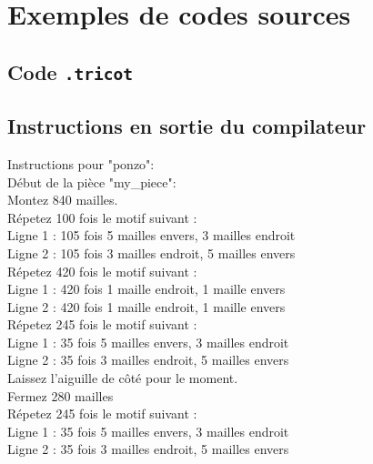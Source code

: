 \documentclass{article}
\begin{document}
\appendix

\section{Exemples de codes sources}

\subsection{Code \texttt{.tricot}}




\subsection{Instructions en sortie du compilateur}

\setlength{\parindent}{0cm}

Instructions pour "ponzo":\\

Début de la pièce "my\_piece":\\
Montez 840 mailles.\\

Répetez 100 fois le motif suivant :\\
Ligne 1 : 105 fois 5 mailles envers, 3 mailles endroit\\
Ligne 2 : 105 fois 3 mailles endroit, 5 mailles envers\\


Répetez 420 fois le motif suivant :\\
Ligne 1 : 420 fois 1 maille endroit, 1 maille envers\\
Ligne 2 : 420 fois 1 maille endroit, 1 maille envers\\


Répetez 245 fois le motif suivant :\\
Ligne 1 : 35 fois 5 mailles envers, 3 mailles endroit\\
Ligne 2 : 35 fois 3 mailles endroit, 5 mailles envers\\

Laissez l'aiguille de côté pour le moment.\\
Fermez 280 mailles\\

Répetez 245 fois le motif suivant :\\
Ligne 1 : 35 fois 5 mailles envers, 3 mailles endroit\\
Ligne 2 : 35 fois 3 mailles endroit, 5 mailles envers\\
\end{document}
